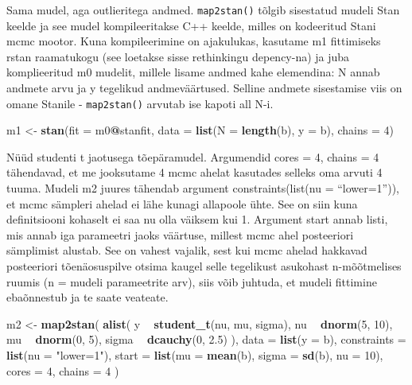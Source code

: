 \documentclass[]{book}
\newenvironment{Shaded}{\begin{snugshade}}{\end{snugshade}}
\newcommand{\KeywordTok}[1]{\textcolor[rgb]{0.13,0.29,0.53}{\textbf{#1}}}
\newcommand{\DataTypeTok}[1]{\textcolor[rgb]{0.13,0.29,0.53}{#1}}
\newcommand{\DecValTok}[1]{\textcolor[rgb]{0.00,0.00,0.81}{#1}}
\newcommand{\FloatTok}[1]{\textcolor[rgb]{0.00,0.00,0.81}{#1}}
\newcommand{\StringTok}[1]{\textcolor[rgb]{0.31,0.60,0.02}{#1}}
\newcommand{\OperatorTok}[1]{\textcolor[rgb]{0.81,0.36,0.00}{\textbf{#1}}}
\newcommand{\NormalTok}[1]{#1}
\begin{document}
Sama mudel, aga outlieritega andmed. \texttt{map2stan()} tõlgib
sisestatud mudeli Stan keelde ja see mudel kompileeritakse C++ keelde,
milles on kodeeritud Stani mcmc mootor. Kuna kompileerimine on
ajakulukas, kasutame m1 fittimiseks rstan raamatukogu (see loetakse
sisse rethinkingu depency-na) ja juba komplieeritud m0 mudelit, millele
lisame andmed kahe elemendina: N annab andmete arvu ja y tegelikud
andmeväärtused. Selline andmete sisestamise viis on omane Stanile -
\texttt{map2stan()} arvutab ise kapoti all N-i.

\begin{Shaded}
\begin{Highlighting}[]
\NormalTok{m1 <-}\StringTok{ }\KeywordTok{stan}\NormalTok{(}\DataTypeTok{fit =}\NormalTok{ m0}\OperatorTok{@}\NormalTok{stanfit,}
           \DataTypeTok{data =} \KeywordTok{list}\NormalTok{(}\DataTypeTok{N =} \KeywordTok{length}\NormalTok{(b), }
                       \DataTypeTok{y =}\NormalTok{ b),}
           \DataTypeTok{chains =} \DecValTok{4}\NormalTok{)}
\end{Highlighting}
\end{Shaded}

Nüüd studenti t jaotusega tõepäramudel. Argumendid cores = 4, chains = 4
tähendavad, et me jooksutame 4 mcmc ahelat kasutades selleks oma arvuti
4 tuuma. Mudeli m2 juures tähendab argument constraints(list(nu =
``lower=1'')), et mcmc sämpleri ahelad ei lähe kunagi allapoole ühte.
See on siin kuna definitsiooni kohaselt ei saa nu olla väiksem kui 1.
Argument start annab listi, mis annab iga parameetri jaoks väärtuse,
millest mcmc ahel posteeriori sämplimist alustab. See on vahest vajalik,
sest kui mcmc ahelad hakkavad posteeriori tõenäosuspilve otsima kaugel
selle tegelikust asukohast n-mõõtmelises ruumis (n = mudeli parameetrite
arv), siis võib juhtuda, et mudeli fittimine ebaõnnestub ja te saate
veateate.

\begin{Shaded}
\begin{Highlighting}[]
\NormalTok{m2 <-}\StringTok{ }\KeywordTok{map2stan}\NormalTok{(}
  \KeywordTok{alist}\NormalTok{(}
\NormalTok{    y }\OperatorTok{~}\StringTok{ }\KeywordTok{student_t}\NormalTok{(nu, mu, sigma),}
\NormalTok{    nu }\OperatorTok{~}\StringTok{ }\KeywordTok{dnorm}\NormalTok{(}\DecValTok{5}\NormalTok{, }\DecValTok{10}\NormalTok{), }
\NormalTok{    mu }\OperatorTok{~}\StringTok{ }\KeywordTok{dnorm}\NormalTok{(}\DecValTok{0}\NormalTok{, }\DecValTok{5}\NormalTok{),}
\NormalTok{    sigma }\OperatorTok{~}\StringTok{ }\KeywordTok{dcauchy}\NormalTok{(}\DecValTok{0}\NormalTok{, }\FloatTok{2.5}\NormalTok{)}
\NormalTok{    ),}
  \DataTypeTok{data =} \KeywordTok{list}\NormalTok{(}\DataTypeTok{y =}\NormalTok{ b),}
  \DataTypeTok{constraints =} \KeywordTok{list}\NormalTok{(}\DataTypeTok{nu =} \StringTok{"lower=1"}\NormalTok{),}
  \DataTypeTok{start =} \KeywordTok{list}\NormalTok{(}\DataTypeTok{mu =} \KeywordTok{mean}\NormalTok{(b), }\DataTypeTok{sigma =} \KeywordTok{sd}\NormalTok{(b), }\DataTypeTok{nu =} \DecValTok{10}\NormalTok{),}
  \DataTypeTok{cores =} \DecValTok{4}\NormalTok{,}
  \DataTypeTok{chains =} \DecValTok{4}
\NormalTok{)}
\end{Highlighting}
\end{Shaded}
\end{document}
